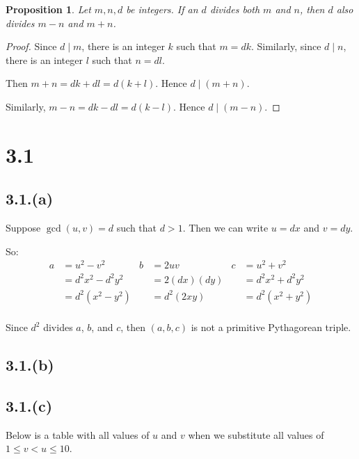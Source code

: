 \documentclass[letterpaper, 12pt]{article}
\theoremstyle{mystyle}
\newtheorem*{prop}{Proposition}
\begin{document}
\begin{prop}
    Let $m,n, d$ be integers. If an $d$ divides both $m$ and $n$, then $d$ also
    divides $m-n$ and $m+n$.
\end{prop}

\begin{proof}
    Since $d \mid m$, there is an integer $k$ such that $m = dk$. Similarly,
    since $d \mid n$, there is an integer $l$ such that $n = dl$.
    
    Then $m+n = dk+dl = d(k+l)$. Hence $d \mid (m+n)$.
    
    Similarly, $m-n = dk-dl = d(k-l)$. Hence $d \mid (m-n)$.
\end{proof}


\section*{3.1}

\subsection*{3.1.(a)}
Suppose $\gcd(u,v) = d$ such that $d > 1$. Then we can write $u = dx$ and 
$v = dy$.

So:
\begin{align*}
    a &= u^2 - v^2          & b &= 2uv          & c &= u^2 + v^2\\
      &= d^2 x^2 - d^2 y^2  &   &= 2(dx)(dy)    &   &= d^2 x^2 + d^2 y^2\\
      &= d^2(x^2 - y^2)     &   &= d^2 (2xy)    &   &= d^2 (x^2 + y^2) \\
\end{align*}

Since $d^2$ divides $a$, $b$, and $c$, then $(a,b,c)$ is not a primitive
Pythagorean triple.

\subsection*{3.1.(b)}

\subsection*{3.1.(c)}
Below is a table with all values of $u$ and $v$ when we substitute all values
of ${1 \leq v < u \leq 10}$.
\end{document}
